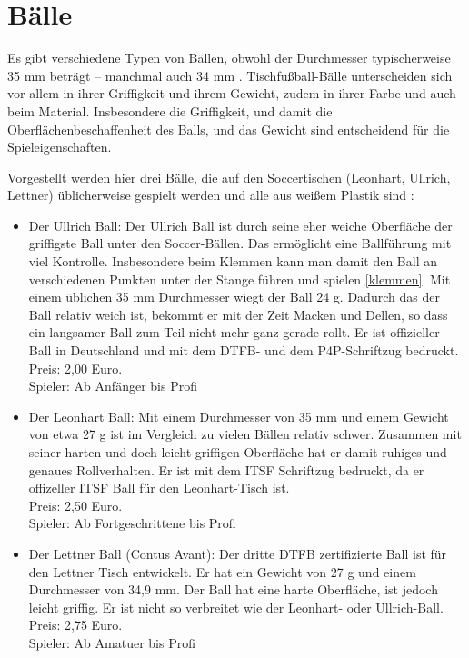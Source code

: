 \section{Bälle}
\label{tisch:baelle}

Es gibt verschiedene Typen von Bällen, obwohl der Durchmesser typischerweise 35 mm beträgt -- manchmal auch 34 mm \citep{www:kickerbau:baelle}.
Tischfußball-Bälle unterscheiden sich vor allem in ihrer Griffigkeit und ihrem Gewicht, zudem in ihrer Farbe und auch beim Material.
Insbesondere die Griffigkeit, und damit die Oberflächenbeschaffenheit des Balls, und das Gewicht sind entscheidend für die Spieleigenschaften.  

Vorgestellt werden hier drei Bälle, die auf den Soccertischen (Leonhart, Ullrich, Lettner) üblicherweise gespielt werden und alle aus weißem Plastik sind \citep{www:tfc-reutlingen}:
\begin{itemize}
\item Der Ullrich Ball:
Der Ullrich Ball ist durch seine eher weiche Oberfläche der griffigste Ball unter den Soccer-Bällen. 
Das ermöglicht eine Ballführung mit viel Kontrolle. Insbesondere beim Klemmen kann man damit den Ball an verschiedenen Punkten unter der Stange führen und spielen \ref{klemmen}.
Mit einem üblichen 35 mm Durchmesser wiegt der Ball 24 g.
Dadurch das der Ball relativ weich ist, bekommt er mit der Zeit Macken und Dellen, so dass ein langsamer Ball zum Teil nicht mehr ganz gerade rollt.
Er ist offizieller Ball in Deutschland und mit dem DTFB- und dem P4P-Schriftzug bedruckt.
\\
Preis: 2,00 Euro. 
\\
Spieler: Ab Anfänger bis Profi
\item Der Leonhart Ball: 
Mit einem Durchmesser von 35 mm und einem Gewicht von etwa 27 g ist im Vergleich zu vielen Bällen relativ schwer. 
Zusammen mit seiner harten und doch leicht griffigen Oberfläche hat er damit ruhiges und genaues Rollverhalten.
Er ist mit dem ITSF Schriftzug bedruckt, da er offizeller ITSF Ball für den Leonhart-Tisch ist.
\\
Preis: 2,50 Euro. 
\\
Spieler: Ab Fortgeschrittene bis Profi
\item Der Lettner Ball (Contus Avant):
Der dritte DTFB zertifizierte Ball ist für den Lettner Tisch entwickelt.
Er hat ein Gewicht von 27 g und einem Durchmesser von 34,9 mm.
Der Ball hat eine harte Oberfläche, ist jedoch leicht griffig. 
Er ist nicht so verbreitet wie der Leonhart- oder Ullrich-Ball. 
\\
Preis: 2,75 Euro.
\\
Spieler: Ab Amatuer bis Profi
\end{itemize}

